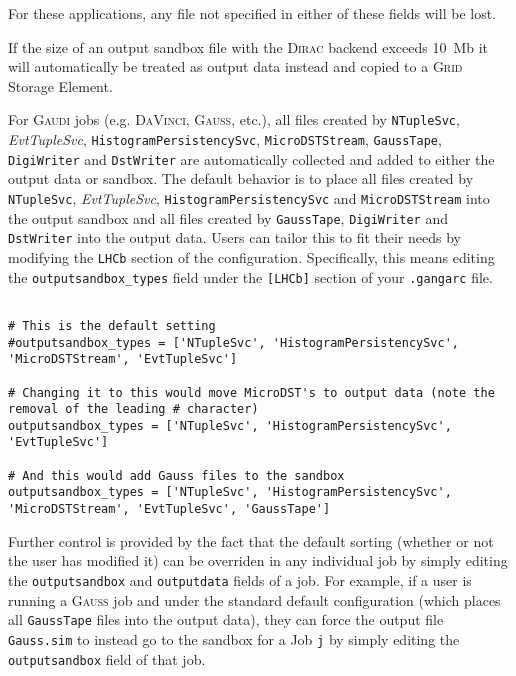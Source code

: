 \documentclass{howto}
\def\gaudi {\textsc{Gaudi}\xspace}
\def\davinci {\textsc{DaVinci}\xspace}
\def\dirac {\textsc{Dirac}\xspace}
\def\gauss {\textsc{Gauss}\xspace}
\def\grid {\textsc{Grid}\xspace}
\begin{document}
For these applications, any file not specified in either of these fields 
will be lost.

\begin{notice}
  If the size of an output sandbox file with the \dirac backend exceeds 10~Mb 
  it will automatically be treated as output data instead and copied to a \grid
  Storage Element.
\end{notice}

For \gaudi jobs (e.g. \davinci, \gauss, etc.), all files created by 
\texttt{NTupleSvc}, \textit{EvtTupleSvc}, \texttt{HistogramPersistencySvc}, 
\texttt{MicroDSTStream},
\texttt{GaussTape}, \texttt{DigiWriter} and \texttt{DstWriter} are 
automatically collected and added to either the output data or sandbox.
The default behavior is to place all files created by 
\texttt{NTupleSvc}, \textit{EvtTupleSvc}, \texttt{HistogramPersistencySvc} and
\texttt{MicroDSTStream} into the output sandbox and all files created by 
\texttt{GaussTape}, \texttt{DigiWriter} and \texttt{DstWriter} into the 
output data. Users can tailor this to fit their needs by modifying the
\texttt{LHCb} section of the configuration. Specifically, this means 
editing the \texttt{outputsandbox_types} field under the \texttt{[LHCb]}
section of your \texttt{.gangarc} file.

\begin{verbatim}

# This is the default setting
#outputsandbox_types = ['NTupleSvc', 'HistogramPersistencySvc', 'MicroDSTStream', 'EvtTupleSvc']

# Changing it to this would move MicroDST's to output data (note the removal of the leading # character)
outputsandbox_types = ['NTupleSvc', 'HistogramPersistencySvc', 'EvtTupleSvc']

# And this would add Gauss files to the sandbox
outputsandbox_types = ['NTupleSvc', 'HistogramPersistencySvc', 'MicroDSTStream', 'EvtTupleSvc', 'GaussTape']

\end{verbatim}

Further control is provided by the fact that the default sorting (whether or 
not the user has modified it) can be overriden in any individual job by 
simply editing the \texttt{outputsandbox} and \texttt{outputdata} fields of
a job. For example, if a user is running a \gauss job and under
the standard default configuration (which places all \texttt{GaussTape} files
into the output data), they can force the output file \texttt{Gauss.sim} to
instead go to the sandbox for a Job \texttt{j} by simply editing the 
\texttt{outputsandbox} field of that job.
\end{document}
